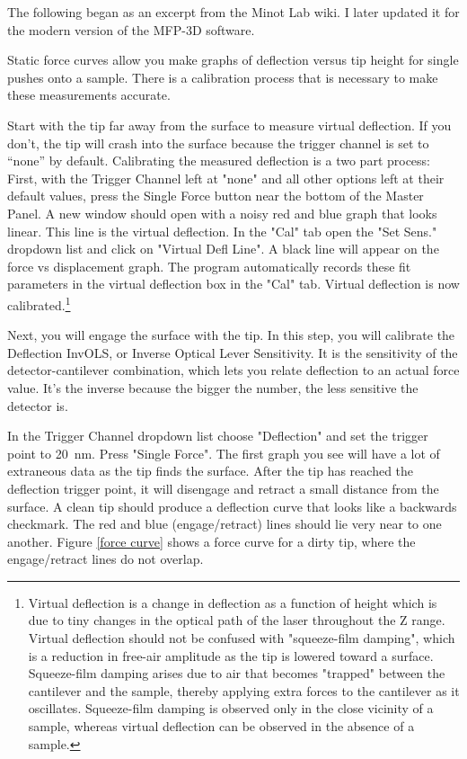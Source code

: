 \documentclass{beavtex_dub_edit}
\begin{document}
The following began as an excerpt from the Minot Lab wiki. I later updated it for the modern version of the MFP-3D software.

Static force curves allow you make graphs of deflection versus tip height for single pushes onto a sample. There is a calibration process that is necessary to make these measurements accurate.

Start with the tip far away from the surface to measure virtual deflection. If you don't, the tip will crash into the surface because the trigger channel is set to “none” by default. Calibrating the measured deflection is a two part process: First, with the Trigger Channel left at "none" and all other options left at their default values, press the Single Force button near the bottom of the Master Panel. A new window should open with a noisy red and blue graph that looks linear. This line is the virtual deflection. In the "Cal" tab open the "Set Sens." dropdown list and click on "Virtual Defl Line". A black line will appear on the force vs displacement graph. The program automatically records these fit parameters in the virtual deflection box in the "Cal" tab. Virtual deflection is now calibrated.\footnote{Virtual deflection is a change in deflection as a function of height which is due to tiny changes in the optical path of the laser throughout the Z range. Virtual deflection should not be confused with "squeeze-film damping", which is a reduction in free-air amplitude as the tip is lowered toward a surface. Squeeze-film damping arises due to air that becomes "trapped" between the cantilever and the sample, thereby applying extra forces to the cantilever as it oscillates. Squeeze-film damping is observed only in the close vicinity of a sample, whereas virtual deflection can be observed in the absence of a sample.}
        
Next, you will engage the surface with the tip. In this step, you will calibrate the Deflection InvOLS, or Inverse Optical Lever Sensitivity. It is the sensitivity of the detector-cantilever combination, which lets you relate deflection to an actual force value. It's the inverse because the bigger the number, the less sensitive the detector is. 

In the Trigger Channel dropdown list choose "Deflection" and set the trigger point to \SI{20}{\nano\meter}. Press "Single Force". The first graph you see will have a lot of extraneous data as the tip finds the surface. After the tip has reached the deflection trigger point, it will disengage and retract a small distance from the surface. A clean tip should produce a deflection curve that looks like a backwards checkmark. The red and blue (engage/retract) lines should lie very near to one another. Figure \ref{force curve} shows a force curve for a dirty tip, where the engage/retract lines do not overlap.
\end{document}
